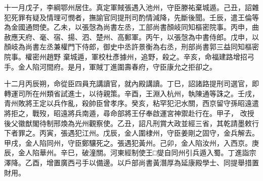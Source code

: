 \begin{pinyinscope}
 十一月戊子，李綱鄂州居住。真定軍賊張遇入池州，守臣滕祐棄城遁。己丑，詔雜犯死罪有疑及情理可憫者，撫諭官同提刑司酌情減降，先斷後聞。壬辰，遣王倫等為金國通問使。乙未，以張愨為尚書左丞，工部尚書顏岐同知樞密院事。丙申，曲赦應天府、毫、宿、揚、泗、楚州、高郵軍。丙午，以張愨為中書侍郎。戊申，以顏岐為尚書左丞兼權門下侍郎，御史中丞許景衡為右丞，刑部尚書郭三益同知樞密院事。權密州趙野
 棄城遁，軍校杜彥據州，追野，殺之。辛亥，命福建路增招弓手。金人陷河間府。是月，軍賊丁進圍壽春府，守臣康允之拒卻之。



 十二月丙辰朔，命從臣四員充講讀官，就內殿講讀。丁巳，詔諸路提刑司選官，即轉運司所在州類省試進士，以待親策。辛酉，王淵入杭州，執陳通等誅之。壬戌，青州敗將王定以兵作亂，殺帥臣曾孝序。癸亥，粘罕犯汜水關，西京留守孫昭遠遣將拒之，戰歿，昭遠將兵南遁，尋命部將王仔奉啟運宮神禦赴行在。甲子，
 改授後父徽猷閣待制邢煥為光州觀察使。乙丑，詔凡刑賞大政並經三省，其乾請墨敕行下者罪之。丙寅，張遇犯江州。戊辰，金人圍棣州，守臣姜剛之固守，金兵解去。甲戌，金人陷同州，守臣鄭驤死之。張遇犯黃州。己卯，金人陷汝州，入西京。庚辰，金人陷華州。辛巳，破潼關。河東經制使王□燮自同州引兵遁入蜀。丁進詣宗澤降。乙酉，增置廣西弓手以備邊。以戶部尚書黃潛厚為延康殿學士、同提舉措置財用。



\end{pinyinscope}
